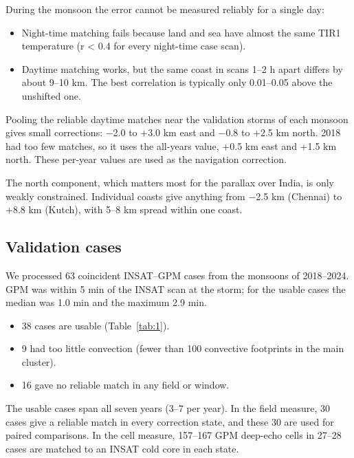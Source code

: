 During the monsoon the error cannot be measured reliably for a single day:

\begin{itemize}
\tightlist
\item
  Night-time matching fails because land and sea have almost the same TIR1 temperature (r \textless{} 0.4 for every night-time case scan).
\item
  Daytime matching works, but the same coast in scans 1--2 h apart differs by about 9--10 km. The best correlation is typically only 0.01--0.05 above the unshifted one.
\end{itemize}

Pooling the reliable daytime matches near the validation storms of each monsoon gives small corrections: −2.0 to +3.0 km east and −0.8 to +2.5 km north. 2018 had too few matches, so it uses the all-years value, +0.5 km east and +1.5 km north. These per-year values are used as the navigation correction.

The north component, which matters most for the parallax over India, is only weakly constrained. Individual coasts give anything from −2.5 km (Chennai) to +8.8 km (Kutch), with 5--8 km spread within one coast.

\subsection{Validation cases}\label{sec:5.3}

We processed 63 coincident INSAT--GPM cases from the monsoons of 2018--2024. GPM was within 5 min of the INSAT scan at the storm; for the usable cases the median was 1.0 min and the maximum 2.9 min.

\begin{itemize}
\tightlist
\item
  38 cases are usable (Table~\ref{tab:1}).
\item
  9 had too little convection (fewer than 100 convective footprints in the main cluster).
\item
  16 gave no reliable match in any field or window.
\end{itemize}

The usable cases span all seven years (3--7 per year). In the field measure, 30 cases give a reliable match in every correction state, and these 30 are used for paired comparisons. In the cell measure, 157--167 GPM deep-echo cells in 27--28 cases are matched to an INSAT cold core in each state.

